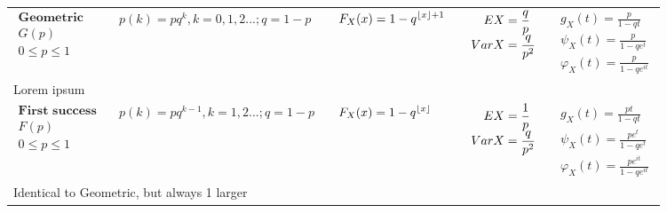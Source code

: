 \documentclass{article}
\DeclarePairedDelimiter\floor{\lfloor}{\rfloor}
\begin{document}
\begin{landscape}
\begin{table}[ht]
\begin{tabular}{@{}l p{6.5cm} p{4.5cm} p{3.0cm} r@{}}
        $\begin{array}{l}
                \textbf{Geometric} \\
                G(p) \\
                0 \leq p \leq 1
        \end{array}$ & 
        $\begin{array}{l}
        \displaystyle p(k) = p q^{k}, k = 0,1,2... ; q = 1-p\\
        \end{array}$ & 
        $\begin{array}{l}
            \displaystyle F_X(x) = 1 - q^{\floor{x} + 1}
        \end{array}$ & 
        $\begin{array}{l}
        \displaystyle \hspace{0.36cm}  EX = \frac{q}{p} \\
        \displaystyle VarX = \frac{q}{p^2}
        \end{array}$ & 
        $\begin{array}{r}
        \displaystyle g_X(t) = \frac{p}{1-qt} \\
        \displaystyle \psi_X(t) = \frac{p}{1-qe^{t}} \\
        \displaystyle \varphi_X(t) = \frac{p}{1-qe^{it}}
        \end{array}$ \\
        \multicolumn{4}{p{19cm}}{Lorem ipsum} \\
        
        $\begin{array}{l}
            \textbf{First success} \\
            F(p) \\
            0 \leq p \leq 1
    \end{array}$ & 
    $\begin{array}{l}
    \displaystyle p(k) = p q^{k-1}, k = 1,2... ; q = 1-p\\
    \end{array}$ & 
    $\begin{array}{l}
        \displaystyle F_X(x) = 1 - q^{\floor{x}}
    \end{array}$ & 
    $\begin{array}{l}
    \displaystyle \hspace{0.36cm}  EX = \frac{1}{p} \\
    \displaystyle VarX = \frac{q}{p^2}
    \end{array}$ & 
    $\begin{array}{r}
    \displaystyle g_X(t) = \frac{pt}{1-qt} \\
    \displaystyle \psi_X(t) = \frac{pe^{t}}{1-qe^{t}} \\
    \displaystyle \varphi_X(t) = \frac{pe^{it}}{1-qe^{it}}
    \end{array}$ \\
    \multicolumn{4}{p{19cm}}{Identical to Geometric, but always 1 larger} \\
        

\end{tabular}
\end{table}
\end{landscape}
\end{document}

